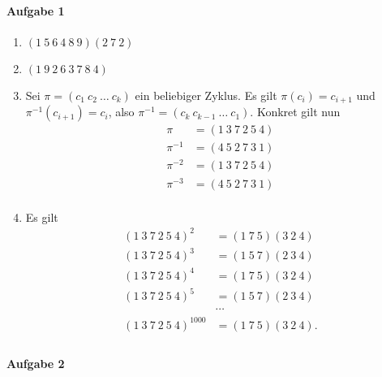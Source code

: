 \documentclass{article}
\begin{document}
\paragraph{Aufgabe 1}

\begin{enumerate}
    \item $(1\ 5\ 6\ 4\ 8\ 9)(2\ 7\ 2)$
    \item $(1\ 9\ 2\ 6\ 3\ 7\ 8\ 4)$
    \item Sei $\pi = (c_1\ c_2\ \ldots\ c_k)$ ein beliebiger Zyklus. Es gilt $\pi(c_i) = c_{i + 1}$ und $\pi^{-1}(c_{i + 1}) = c_i$, also $\pi^{-1} = (c_k\ c_{k-1}\ \ldots\ c_1)$. Konkret gilt nun
    \begin{align*}
        \pi &= (1\ 3\ 7\ 2\ 5\ 4)\\
        \pi^{-1} &= (4\ 5\ 2\ 7\ 3\ 1)\\
        \pi^{-2} &= (1\ 3\ 7\ 2\ 5\ 4)\\
        \pi^{-3} &= (4\ 5\ 2\ 7\ 3\ 1)\\
    \end{align*}

    \item Es gilt
    \begin{align*}
        (1\ 3\ 7\ 2\ 5\ 4)^2 &= (1\ 7\ 5)(3\ 2\ 4)\\
        (1\ 3\ 7\ 2\ 5\ 4)^3 &= (1\ 5\ 7)(2\ 3\ 4)\\
        (1\ 3\ 7\ 2\ 5\ 4)^4 &= (1\ 7\ 5)(3\ 2\ 4)\\
        (1\ 3\ 7\ 2\ 5\ 4)^5 &= (1\ 5\ 7)(2\ 3\ 4)\\
        &\cdots\\
        (1\ 3\ 7\ 2\ 5\ 4)^{1000} &= (1\ 7\ 5)(3\ 2\ 4).\\
    \end{align*}
\end{enumerate}

\paragraph{Aufgabe 2}
\end{document}
